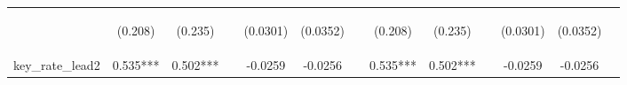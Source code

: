 \documentclass[]{article}
\begin{document}
\begin{center}
\begin{tabular}{lcccccccccccc}
\vspace{4pt} & \begin{footnotesize}(0.208)\end{footnotesize} & \begin{footnotesize}(0.235)\end{footnotesize} & \begin{footnotesize}\end{footnotesize} & \begin{footnotesize}(0.0301)\end{footnotesize} & \begin{footnotesize}(0.0352)\end{footnotesize} & \begin{footnotesize}\end{footnotesize} & \begin{footnotesize}(0.208)\end{footnotesize} & \begin{footnotesize}(0.235)\end{footnotesize} & \begin{footnotesize}\end{footnotesize} & \begin{footnotesize}(0.0301)\end{footnotesize} & \begin{footnotesize}(0.0352)\end{footnotesize} & \begin{footnotesize}\end{footnotesize} \\
key\_rate\_lead2 & 0.535*** & 0.502*** &  & -0.0259 & -0.0256 &  & 0.535*** & 0.502*** &  & -0.0259 & -0.0256 &  \\

\end{tabular}
\end{center}
\end{document}

